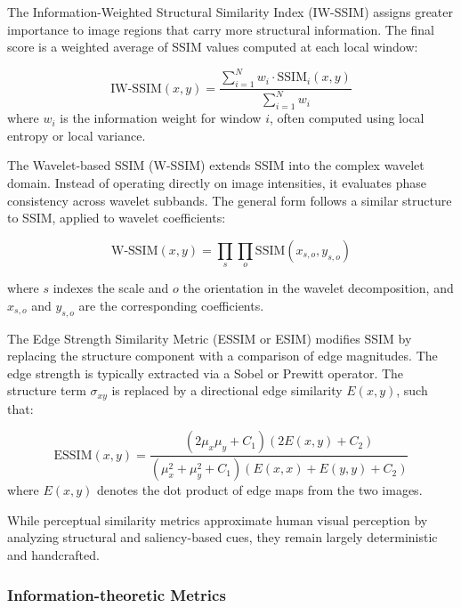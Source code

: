 The Information-Weighted Structural Similarity Index (IW-SSIM) assigns greater importance to image regions that carry more structural information. The final score is a weighted average of SSIM values computed at each local window:

\begin{equation}
\text{IW-SSIM}(x, y) = \frac{\sum_{i=1}^{N} w_i \cdot \text{SSIM}_i(x, y)}{\sum_{i=1}^{N} w_i}
\end{equation}
where $w_i$ is the information weight for window $i$, often computed using local entropy or local variance.

The Wavelet-based SSIM (W-SSIM) extends SSIM into the complex wavelet domain. Instead of operating directly on image intensities, it evaluates phase consistency across wavelet subbands. The general form follows a similar structure to SSIM, applied to wavelet coefficients:

\begin{equation}
\text{W-SSIM}(x, y) = \prod_{s} \prod_{o} \text{SSIM}(x_{s,o}, y_{s,o})
\end{equation}

where $s$ indexes the scale and $o$ the orientation in the wavelet decomposition, and $x_{s,o}$ and $y_{s,o}$ are the corresponding coefficients.

The Edge Strength Similarity Metric (ESSIM or ESIM) modifies SSIM by replacing the structure component with a comparison of edge magnitudes. The edge strength is typically extracted via a Sobel or Prewitt operator. The structure term $\sigma_{xy}$ is replaced by a directional edge similarity $E(x, y)$, such that:

\begin{equation}
\text{ESSIM}(x, y) = \frac{(2\mu_x \mu_y + C_1)(2E(x, y) + C_2)}{(\mu_x^2 + \mu_y^2 + C_1)(E(x, x) + E(y, y) + C_2)}
\end{equation}
where $E(x, y)$ denotes the dot product of edge maps from the two images.

While perceptual similarity metrics approximate human visual perception by analyzing structural and saliency-based cues, they remain largely deterministic and handcrafted.

\subsubsection{Information-theoretic Metrics}\label{sec:learning_based_metrics}

